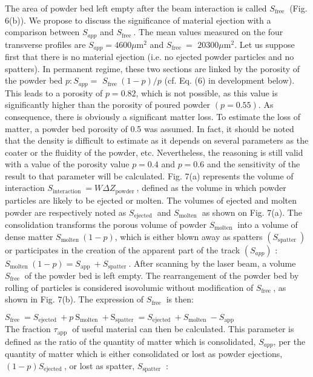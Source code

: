 \documentclass[10pt]{article}
\begin{document}
The area of powder bed left empty after the beam interaction is called $S_{\text {free }}$ (Fig. 6(b)). We propose to discuss the significance of material ejection with a comparison between $S_{a p p}$ and $S_{\text {free }}$. The mean values measured on the four transverse profiles are $S_{a p p}=4600 \mu \mathrm{m}^{2}$ and $S_{\text {free }}=$ $20300 \mu \mathrm{m}^{2}$. Let us suppose first that there is no material ejection (i.e. no ejected powder particles and no spatters). In permanent regime, these two sections are linked by the porosity of the powder bed $p: S_{a p p}=$ $S_{\text {free }}(1-p) / p$ (cf. Eq. (6) in development below). This leads to a porosity of $p=0.82$, which is not possible, as this value is significantly higher than the porosity of poured powder $(p=0.55)$. As consequence, there is obviously a significant matter loss. To estimate the loss of matter, a powder bed porosity of 0.5 was assumed. In fact, it should be noted that the density is difficult to estimate as it depends on several parameters as the coater or the fluidity of the powder, etc. Nevertheless, the reasoning is still valid with a value of the porosity value $p=0.4$ and $p=0.6$ and the sensitivity of the result to that parameter will be calculated. Fig. 7(a) represents the volume of interaction $S_{\text {interaction }}=W \Delta Z_{\text {powder }}$, defined as the volume in which powder particles are likely to be ejected or molten. The volumes of ejected and molten powder are respectively noted as $S_{\text {ejected }}$ and $S_{\text {molten }}$ as shown on Fig. 7(a). The consolidation transforms the porous volume of powder $S_{\text {molten }}$ into a volume of dense matter $S_{\text {molten }}(1-p)$, which is either blown away as spatters $\left(S_{\text {spatter }}\right)$ or participates in the creation of the apparent part of the track $\left(S_{a p p}\right)$ : $S_{\text {molten }}(1-p)=S_{\text {app }}+S_{\text {spatter }}$. After scanning by the laser beam, a volume $S_{\text {free }}$ of the powder bed is left empty. The rearrangement of the powder bed by rolling of particles is considered isovolumic without modification of $S_{\text {free }}$, as shown in Fig. 7(b). The expression of $S_{\text {free }}$ is then:

$S_{\text {free }}=S_{\text {ejected }}+p \mathrm{~S}_{\text {molten }}+\mathrm{S}_{\text {spatter }}=S_{\text {ejected }}+S_{\text {molten }}-S_{\text {app }}$\\
The fraction $\tau_{\text {app }}$ of useful material can then be calculated. This parameter is defined as the ratio of the quantity of matter which is consolidated, $S_{a p p}$, per the quantity of matter which is either consolidated or lost as powder ejections, $(1-p) S_{\text {ejected }}$, or lost as spatter, $S_{\text {spatter }}$ :
\end{document}
